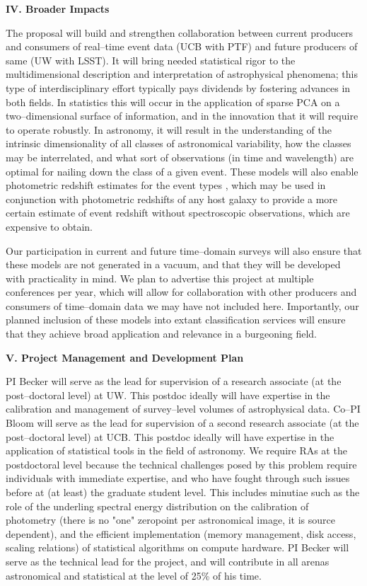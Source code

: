 \bigskip \centerline{\bf IV. Broader Impacts} \smallskip

The proposal will build and strengthen collaboration between current producers
and consumers of real--time event data (UCB with PTF) and future producers of
same (UW with LSST).  It will bring needed statistical rigor to the
multidimensional description and interpretation of astrophysical phenomena; this
type of interdisciplinary effort typically pays dividends by fostering advances
in both fields.  In statistics this will occur in the application of sparse PCA
on a two--dimensional surface of information, and in the innovation that it will
require to operate robustly.  In astronomy, it will result in the understanding
of the intrinsic dimensionality of all classes of astronomical variability, how
the classes may be interrelated, and what sort of observations (in time and
wavelength) are optimal for nailing down the class of a given event.  These
models will also enable photometric redshift estimates for the event types
\citep[e.g.][]{2010ApJ...717...40K}, which may be used in conjunction with
photometric redshifts of any host galaxy \citep[e.g.][]{1962IAUS...15..390B} to
provide a more certain estimate of event redshift without spectroscopic
observations, which are expensive to obtain.

Our participation in current and future time--domain surveys will also ensure
that these models are not generated in a vacuum, and that they will be developed
with practicality in mind.  We plan to advertise this project at multiple
conferences per year, which will allow for collaboration with other producers
and consumers of time--domain data we may have not included here. Importantly,
our planned inclusion of these models into extant classification services will
ensure that they achieve broad application and relevance in a burgeoning field.


\bigskip \centerline{\bf V. Project Management and Development Plan} \smallskip

PI Becker will serve as the lead for supervision of a research associate (at the
post--doctoral level) at UW.  This postdoc ideally will have expertise in the
calibration and management of survey--level volumes of astrophysical data.
Co--PI Bloom will serve as the lead for supervision of a second research
associate (at the post--doctoral level) at UCB.  This postdoc ideally will have
expertise in the application of statistical tools in the field of astronomy.  We
require RAs at the postdoctoral level because the technical challenges posed by
this problem require individuals with immediate expertise, and who have fought
through such issues before at (at least) the graduate student level. This
includes minutiae such as the role of the underling spectral energy distribution
on the calibration of photometry (there is no "one" zeropoint per astronomical
image, it is source dependent), and the efficient implementation (memory
management, disk access, scaling relations) of statistical algorithms on compute
hardware. PI Becker will serve as the technical lead for the project, and will
contribute in all arenas astronomical and statistical at the level of 25\% of
his time.

